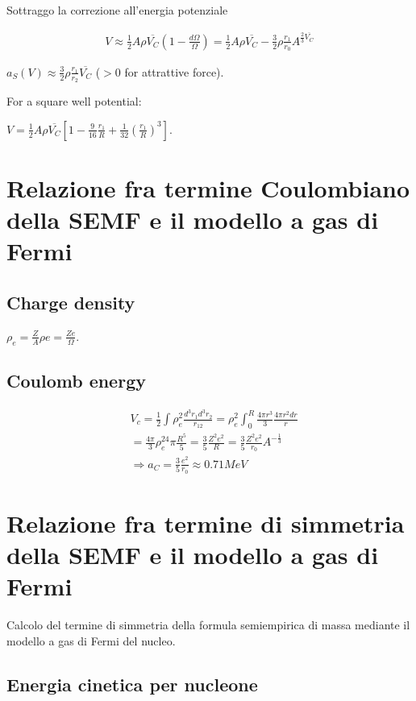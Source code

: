 \documentclass[main.tex]{subfiles}
\begin{document}
\begin{enumerate*}
Sottraggo la correzione all'energia potenziale 

\begin{align*}
V\approx\frac{1}{2}A\rho\overline{V_C}(1-\frac{d\Omega}{\Omega})=\frac{1}{2}A\rho\overline{V_C}-\frac{3}{2}\rho\frac{r_1}{r_0}A^{\frac{2}{3}\overline{V_C}}
\end{align*}

$a_S(V)\approx\frac{3}{2}\rho\frac{r_1}{r_2}\overline{V_C}$ ($>0$ for attrattive force).

For a square well potential:

$V=\frac{1}{2}A\rho\overline{V_C}[1-\frac{9}{16}\frac{r_1}{R}+\frac{1}{32}(\frac{r_1}{R})^3]$.
\end{enumerate*}

\section{Relazione fra termine Coulombiano della SEMF e il modello a gas di Fermi}

\subsection{Charge density}

$\rho_e=\frac{Z}{A}\rho e=\frac{Ze}{\Omega}$.

\subsection{Coulomb energy}

\begin{align*}
&V_c=\frac{1}{2}\int\rho_e^2\frac{d^3r_1d^3r_2}{r_{12}}=\rho_e^2\int_0^R\frac{4\pi r^3}{3}\frac{4\pi r^2dr}{r}\\
&=\frac{4\pi}{3}\rho_e^24\pi\frac{R^5}{5}=\frac{3}{5}\frac{Z^2e^2}{R}=\frac{3}{5}\frac{Z^2e^2}{r_0}A^{-\frac{1}{3}}\\
&\Rightarrow a_C=\frac{3}{5}\frac{e^2}{r_0}\approx 0.71 MeV
\end{align*}

\section{Relazione fra termine di simmetria della SEMF e il modello a gas di Fermi}
Calcolo del termine di simmetria della formula semiempirica di massa mediante il modello a gas di Fermi del nucleo.

\subsection{Energia cinetica per nucleone}
\end{document}
